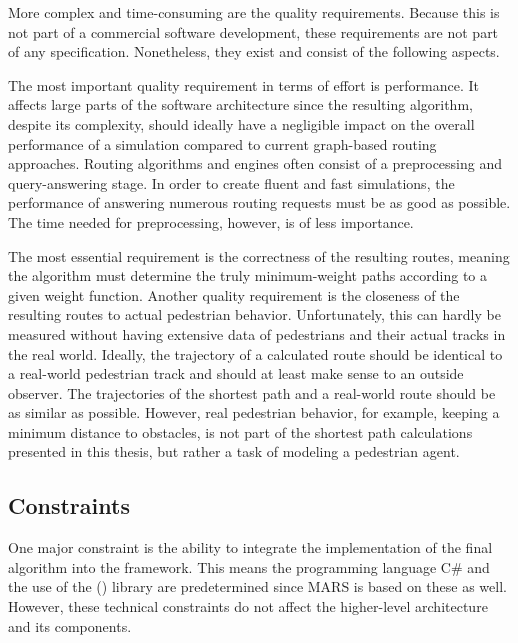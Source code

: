 		More complex and time-consuming are the quality requirements.
		Because this is not part of a commercial software development, these requirements are not part of any specification.
		Nonetheless, they exist and consist of the following aspects.
	
		The most important quality requirement in terms of effort is performance.
		It affects large parts of the software architecture since the resulting algorithm, despite its complexity, should ideally have a negligible impact on the overall performance of a simulation compared to current graph-based routing approaches.
		Routing algorithms and engines often consist of a preprocessing and query-answering stage.
		In order to create fluent and fast simulations, the performance of answering numerous routing requests must be as good as possible.
		The time needed for preprocessing, however, is of less importance.
		
		The most essential requirement is the correctness of the resulting routes, meaning the algorithm must determine the truly minimum-weight paths according to a given weight function.
		Another quality requirement is the closeness of the resulting routes to actual pedestrian behavior.
		Unfortunately, this can hardly be measured without having extensive data of pedestrians and their actual tracks in the real world.
		Ideally, the trajectory of a calculated route should be identical to a real-world pedestrian track and should at least make sense to an outside observer.
		The trajectories of the shortest path and a real-world route should be as similar as possible.
		However, real pedestrian behavior, for example, keeping a minimum distance to obstacles, is not part of the shortest path calculations presented in this thesis, but rather a task of modeling a pedestrian agent.
	
	\subsection{Constraints}
	\label{subsec:constraints}
		
		One major constraint is the ability to integrate the implementation of the final algorithm into the  framework.
		This means the programming language C\# and the use of the  () library are predetermined since MARS is based on these as well.
		However, these technical constraints do not affect the higher-level architecture and its components.
		
